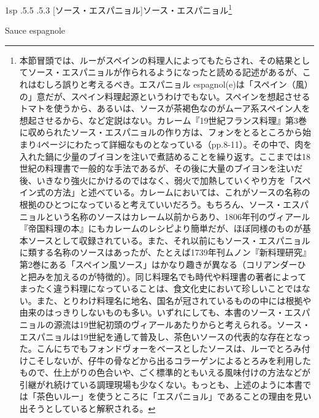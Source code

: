 \documentclass[14Q,a4paperpaper,]{ltjsbook}
\makeatletter
\renewcommand{\headfont}{\gtfamily\sffamily\bfseries}%
\let\footnotes@ve=\footnote
\def\footnote{\inhibitglue\footnotes@ve}
\newenvironment{recette}{\setlength{\parindent}{0pt}\begin{spacing}{0.8}\begin{multicols}{2}\setlength\topskip{.8\baselineskip}}{\end{multicols}\end{spacing}}
\newcommand{\medlarge}{\fontsize{11}{13}\selectfont}
\renewcommand{\subsubsection}{\@startsection{subsubsection}{3}{\z@}%
    {1sp \@plus.5\Cdp \@minus.5\Cdp}%
    {\if@slide .5\Cvs \@plus.3\Cdp \else \z@ \fi}%
    {\normalfont\medlarge\headfont\leftskip -1\zw}}
\newenvironment{frsubenv}{\begin{spacing}{0.2}\setlength{\leftskip}{-1\zw}\bfseries}{\end{spacing}\normalfont\normalsize\setlength{\leftskip}{0pt}\par\vspace{1.1\zw}}
\makeatother
\begin{document}
\begin{recette}

\hypertarget{sauce-espagnole}{%
\subsubsection[ソース・エスパニョル]{\texorpdfstring{ソース・エスパニョル\footnote{本節冒頭では、ルーがスペインの料理人によってもたらされ、その結果としてソース・エスパニョルが作られるようになったと読める記述があるが、これはむしろ誤りと考えるべき。エスパニョル
  espagnol(e)は「スペイン（風）の」意だが、スペイン料理起源というわけでもない。スペインを想起させるトマトを使うから、あるいは、ソースが茶褐色なのがムーア系スペイン人を想起させるから、など定説はない。カレーム『19世紀フランス料理』第3巻に収められたソース・エスパニョルの作り方は、フォンをとるところから始まり4ページにわたって詳細なものとなっている（pp.8-11）。その中で、肉を入れた鍋に少量のブイヨンを注いで煮詰めることを繰り返す。ここまでは18世紀の料理書で一般的な手法であるが、その後に大量のブイヨンを注いだ後、いきなり強火にかけるのではなく、弱火で加熱していくやり方を「スペイン式の方法」と述べている。カレームにおいては、これがソースの名称の根拠のひとつになっていると考えていいだろう。もちろん、ソース・エスパニョルという名称のソースはカレーム以前からあり、1806年刊のヴィアール『帝国料理の本』にもカレームのレシピより簡単だが、ほぼ同様のものが基本ソースとして収録されている。また、それ以前にもソース・エスパニョルに類する名称のソースはあったが、たとえば1739年刊ムノン『新料理研究』第2巻にある「スペイン風ソース」はかなり趣きが異なる（コリアンダーひと把みを加えるのが特徴的）。同じ料理名でも時代や料理書の著者によってまったく違う料理になっていることは、食文化史において珍しいことではない。また、とりわけ料理名に地名、国名が冠されているものの中には根拠や由来のはっきりしないものも多い。いずれにしても、本書のソース・エスパニョルの源流は19世紀初頭のヴィアールあたりからと考えられる。ソース・エスパニョルは19世紀を通して普及し、茶色いソースの代表的な存在となった。こんにちでもフォンドヴォーをベースとしたソースは、ルーでとろみ付けこそしないが、仔牛の骨などから出るコラーゲンによるとろみを利用したもので、仕上がりの色合いや、ごく標準的ともいえる風味付けの方法などが引継がれ続けている調理現場も少なくない。もっとも、上述のように本書では「茶色いルー」を使うところに「エスパニョル」であることの理由を見い出そうとしていると解釈される。}}{ソース・エスパニョル}}\label{sauce-espagnole}}

\begin{frsubenv}

Sauce espagnole


\end{frsubenv}
\end{recette}
\end{document}
